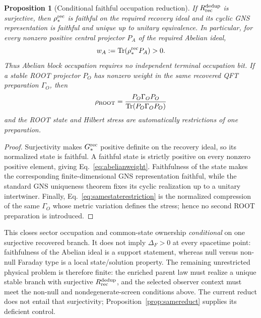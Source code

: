 \documentclass[11pt]{article}
\newtheorem{proposition}{Proposition}
\begin{document}
\begin{proposition}[Conditional faithful occupation reduction]
\label{prop:faithfuloccupation}
If $R_{\rm rec}^{\rm dedup}$ is surjective, then
$\rho_*^{\rm rec}$ is faithful on the required recovery ideal and its cyclic
GNS representation is faithful and unique up to unitary equivalence.
In particular, for
every nonzero positive central projector $P_A$ of the required Abelian ideal,
\begin{equation}
w_A:=\operatorname{Tr}(\rho_*^{\rm rec}P_A)>0.
\label{eq:abelianweight}
\end{equation}
Thus Abelian block occupation requires no independent terminal occupation
bit.  If a stable ROOT projector $P_O$ has nonzero weight in the same
recovered QFT preparation $\Gamma_O$, then
\begin{equation}
\rho_{\rm ROOT}
={P_O\Gamma_OP_O\over\operatorname{Tr}(P_O\Gamma_OP_O)}
\label{eq:samestaterestriction}
\end{equation}
and the ROOT state and Hilbert stress are automatically restrictions of one
preparation.
\end{proposition}

\begin{proof}
Surjectivity makes $G_*^{\rm rec}$ positive definite on the recovery ideal,
so its normalized state is faithful.  A faithful state is strictly positive
on every nonzero positive element, giving Eq.~\eqref{eq:abelianweight}.
Faithfulness of the state makes the corresponding finite-dimensional GNS
representation faithful, while the standard GNS uniqueness theorem fixes its
cyclic realization up to a unitary intertwiner.  Finally,
Eq.~\eqref{eq:samestaterestriction} is the normalized compression of the same
$\Gamma_O$ whose metric variation defines the stress; hence no second ROOT
preparation is introduced.
\end{proof}

This closes sector occupation and common-state ownership \emph{conditional}
on one surjective recovered branch.  It does not imply
$\Delta_F>0$ at every spacetime point: faithfulness of the Abelian ideal is a
support statement, whereas null versus non-null Faraday type is a local
state/solution property.  The remaining unrestricted physical problem is
therefore finite: the enriched parent law must realize a unique stable branch with
surjective $R_{\rm rec}^{\rm dedup}$, and the selected observer context must
meet the non-null and nondegenerate-screen conditions above.  The current
reduct does not entail that surjectivity; Proposition~\ref{prop:samereduct}
supplies its deficient control.
\end{document}
